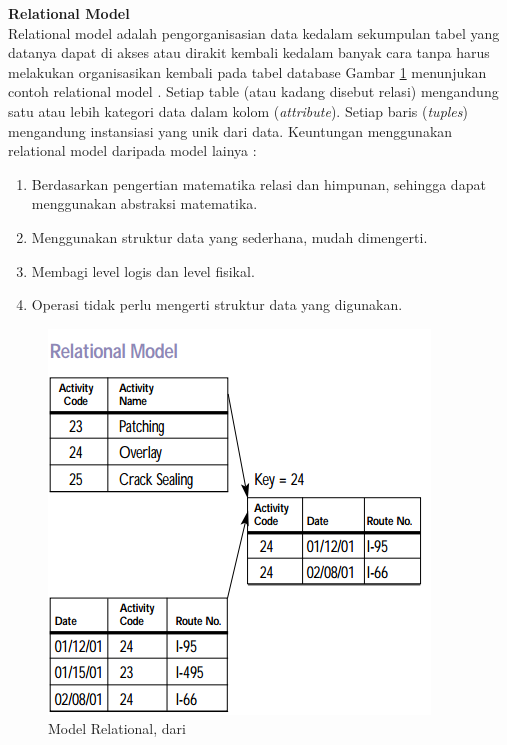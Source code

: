 \textbf{Relational Model}\\
Relational model adalah pengorganisasian data kedalam sekumpulan tabel yang datanya dapat di akses atau dirakit kembali kedalam banyak cara tanpa harus melakukan organisasikan kembali pada tabel database Gambar \ref{fig:relational} menunjukan contoh relational model \cite{RelationDefinition:2001}. Setiap table (atau kadang disebut relasi) mengandung satu atau lebih kategori data dalam kolom (\textit{attribute}). Setiap baris (\textit{tuples}) mengandung instansiasi yang unik dari data. Keuntungan menggunakan relational model daripada model lainya :
\begin{enumerate}
	\item Berdasarkan pengertian matematika relasi dan himpunan, sehingga dapat menggunakan abstraksi matematika.
	\item Menggunakan struktur data yang sederhana, mudah dimengerti.
	\item Membagi level logis dan level fisikal. 
	\item Operasi tidak perlu mengerti struktur data yang digunakan.
\end{enumerate}
	\begin{figure}
	\centering
	\includegraphics[width=0.6\linewidth]{Gambar/mine/relational}
	\caption[Model Relational, dari \cite{RelationDefinition:2001}]{Model Relational, dari \cite{RelationDefinition:2001}} 
	\label{fig:relational}
	\end{figure}
